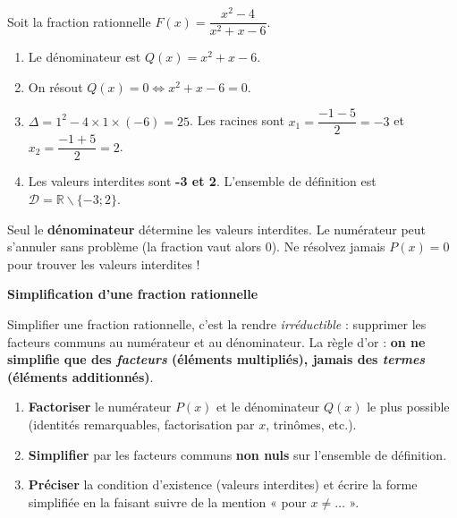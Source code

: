 \documentclass[11pt]{article}
\def\setminus{\mathbin{\backslash}}\let\smallsetminus\setminus
\begin{document}
\begin{exemplebox}
Soit la fraction rationnelle $F(x) = \dfrac{x^2 - 4}{x^2 + x - 6}$.
\begin{enumerate}
\item Le dénominateur est $Q(x) = x^2 + x - 6$.
\item On résout $Q(x) = 0 \iff x^2 + x - 6 = 0$.
\item $\Delta = 1^2 - 4 \times 1 \times (-6) = 25$. Les racines sont $x_1 = \dfrac{-1 - 5}{2} = -3$ et $x_2 = \dfrac{-1 + 5}{2} = 2$.
\item Les valeurs interdites sont \textbf{-3 et 2}. L'ensemble de définition est $\mathcal{D} = \mathbb{R} \setminus \{-3; 2\}$.
\end{enumerate}
\end{exemplebox}

\begin{attention}
Seul le \textbf{dénominateur} détermine les valeurs interdites. Le numérateur peut s'annuler sans problème (la fraction vaut alors 0). Ne résolvez jamais $P(x)=0$ pour trouver les valeurs interdites !
\end{attention}

\textbf{Simplification d'une fraction rationnelle}\par

Simplifier une fraction rationnelle, c'est la rendre \emph{irréductible} : supprimer les facteurs communs au numérateur et au dénominateur. La règle d'or : \textbf{on ne simplifie que des \emph{facteurs} (éléments multipliés), jamais des \emph{termes} (éléments additionnés)}.

\begin{methode}
\begin{enumerate}
\item \textbf{Factoriser} le numérateur $P(x)$ et le dénominateur $Q(x)$ le plus possible (identités remarquables, factorisation par $x$, trinômes, etc.).
\item \textbf{Simplifier} par les facteurs communs \textbf{non nuls} sur l'ensemble de définition.
\item \textbf{Préciser} la condition d'existence (valeurs interdites) et écrire la forme simplifiée en la faisant suivre de la mention « pour $x \neq \dots$ ».
\end{enumerate}
\end{methode}
\end{document}
